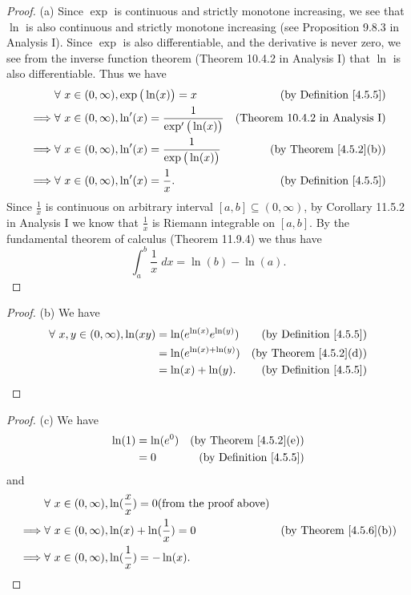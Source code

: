 \begin{proof}{(a)}
    Since \(\exp\) is continuous and strictly monotone increasing, we see that \(\ln\) is also continuous and strictly monotone increasing (see Proposition 9.8.3 in Analysis I).
    Since \(\exp\) is also differentiable, and the derivative is never zero, we see from the inverse function theorem (Theorem 10.4.2 in Analysis I) that \(\ln\) is also differentiable.
    Thus we have
    \begin{align*}
                 & \forall\ x \in (0, \infty), \exp\big(\ln(x)\big) = x                  & \text{(by Definition \ref{4.5.5})}    \\
        \implies & \forall\ x \in (0, \infty), \ln'(x) = \frac{1}{\exp'\big(\ln(x)\big)} & \text{(Theorem 10.4.2 in Analysis I)} \\
        \implies & \forall\ x \in (0, \infty), \ln'(x) = \frac{1}{\exp\big(\ln(x)\big)}  & \text{(by Theorem \ref{4.5.2}(b))}    \\
        \implies & \forall\ x \in (0, \infty), \ln'(x) = \frac{1}{x}.                    & \text{(by Definition \ref{4.5.5})}
    \end{align*}
    Since \(\frac{1}{x}\) is continuous on arbitrary interval \([a, b] \subseteq (0, \infty)\), by Corollary 11.5.2 in Analysis I we know that \(\frac{1}{x}\) is Riemann integrable on \([a, b]\).
    By the fundamental theorem of calculus (Theorem 11.9.4) we thus have
    \[
        \int_a^b \frac{1}{x} \; dx = \ln(b) - \ln(a).
    \]
\end{proof}

\begin{proof}{(b)}
    We have
    \begin{align*}
        \forall\ x, y \in (0, \infty), \ln(xy) & = \ln(e^{\ln(x)} e^{\ln(y)}) & \text{(by Definition \ref{4.5.5})} \\
                                               & = \ln(e^{\ln(x) + \ln(y)})   & \text{(by Theorem \ref{4.5.2}(d))} \\
                                               & = \ln(x) + \ln(y).           & \text{(by Definition \ref{4.5.5})}
    \end{align*}
\end{proof}

\begin{proof}{(c)}
    We have
    \begin{align*}
        \ln(1) & = \ln(e^0) & \text{(by Theorem \ref{4.5.2}(e))} \\
               & = 0        & \text{(by Definition \ref{4.5.5})}
    \end{align*}
    and
    \begin{align*}
                 & \forall\ x \in (0, \infty), \ln(\frac{x}{x}) = 0 \text{(from the proof above)}                                      \\
        \implies & \forall\ x \in (0, \infty), \ln(x) + \ln(\frac{1}{x}) = 0                      & \text{(by Theorem \ref{4.5.6}(b))} \\
        \implies & \forall\ x \in (0, \infty), \ln(\frac{1}{x}) = -\ln(x).
    \end{align*}
\end{proof}


